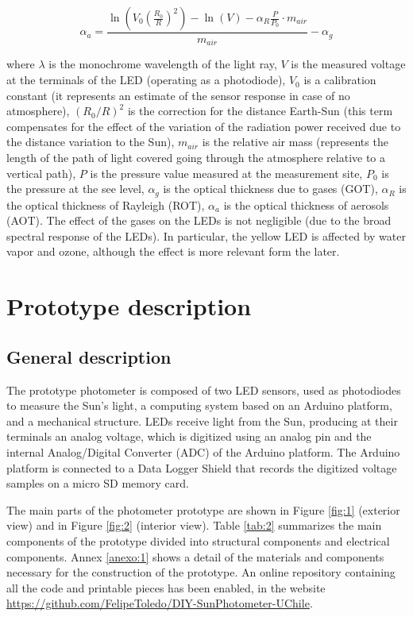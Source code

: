 \documentclass[12pt,letterpaper]{article}
\numberwithin{figure}{section}
\numberwithin{equation}{section}
\numberwithin{table}{section}
\begin{document}
\begin{equation}
    \alpha_a = \frac{\ln\left(V_0\left(\frac{R_0}{R}\right)^2\right) - \ln\left( V \right) - \alpha_R \frac{P}{P_0} \cdot m_{air} }{ m_{air} } - \alpha_g
    \label{eq:001}
\end{equation}

where $\lambda$ is the monochrome wavelength of the light ray, $V$ is the measured voltage at the terminals of the LED (operating as a photodiode), $V_0$ is a calibration constant (it represents an estimate of the sensor response in case of no atmosphere), $(R_0/R)^2$ is the correction for the distance Earth-Sun (this term compensates for the effect of the variation of the radiation power received due to the distance variation to the Sun), $m_{air}$ is the relative air mass (represents the length of the path of light covered going through the atmosphere relative to a vertical path), $P$ is the pressure value measured at the measurement site, $P_0$ is the pressure at the see level, $\alpha_g $ is the optical thickness due to gases (GOT), $\alpha_R$ is the optical thickness of Rayleigh (ROT), $\alpha_a$ is the optical thickness of aerosols (AOT). The effect of the gases on the LEDs is not negligible (due to the broad spectral response of the LEDs). In particular, the yellow LED is affected by water vapor and ozone, although the effect is more relevant form the later.


\newpage
\section{Prototype description}

\subsection{General description}

The prototype photometer is composed of two LED sensors, used as photodiodes to measure the Sun's light, a computing system based on an Arduino platform, and a mechanical structure. LEDs receive light from the Sun, producing at their terminals an analog voltage, which is digitized using an analog pin and the internal Analog/Digital Converter (ADC) of the Arduino platform. The Arduino platform is connected to a Data Logger Shield that records the digitized voltage samples on a micro SD memory card.

The main parts of the photometer prototype are shown in Figure \ref{fig:1} (exterior view) and in Figure \ref{fig:2} (interior view). Table \ref{tab:2} summarizes the main components of the prototype divided into structural components and electrical components. Annex \ref{anexo:1} shows a detail of the materials and components necessary for the construction of the prototype. An online repository containing all the code and printable pieces has been enabled, in the website \url{https://github.com/FelipeToledo/DIY-SunPhotometer-UChile}.
\end{document}
